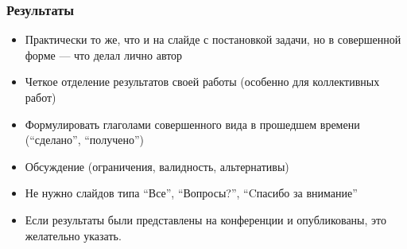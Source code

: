 \documentclass{beamer}
\begin{document}
\begin{frame}
  \transwipe[direction=90]
  \frametitle{Результаты}
  \begin{itemize}
    \item Практически то же, что и на слайде с постановкой задачи, но в совершенной форме — что делал лично автор
    \item Четкое отделение результатов своей работы (особенно для коллективных работ)
    \item Формулировать глаголами совершенного вида в прошедшем времени (``сделано'', ``получено'')
    \item Обсуждение (ограничения, валидность, альтернативы)
    \item Не нужно слайдов типа ``Все'', ``Вопросы?'', ``Cпасибо за внимание''
  \end{itemize}

  \begin{itemize}
    \item Если результаты были представлены на конференции и опубликованы, это желательно указать. 
  \end{itemize}
\end{frame}
\end{document}
